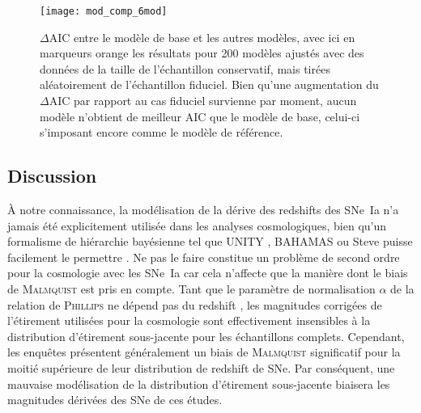 \documentclass[../main/main.tex]{subfiles}
\begin{document}
\begin{SCfigure}[0.8][ht!]
    \texttt{[image: mod\_comp\_6mod]}
    \caption[$\Delta$AIC pour des échantillons de taille conservative tirés
    aléatoirement de l'échantillon fiduciel]{$\Delta$AIC entre le modèle de
        base et les autres modèles, avec ici en marqueurs orange les
        résultats pour 200 modèles ajustés avec des données de la taille de
        l'échantillon conservatif, mais tirées aléatoirement de l'échantillon
        fiduciel. Bien qu'une augmentation du $\Delta$AIC par rapport au cas
        fiduciel survienne par moment, aucun modèle n'obtient de meilleur AIC
        que le modèle de base, celui-ci s'imposant encore comme le modèle de
    référence.}
    \label{fig:mod_comp_cal}
\end{SCfigure}

\subsection{Discussion}\label{ssec:disc}

À notre connaissance, la modélisation de la dérive des redshifts des SNe~Ia n'a
jamais été explicitement utilisée dans les analyses cosmologiques, bien qu'un
formalisme de hiérarchie bayésienne tel que UNITY \citep{rubin2015}, BAHAMAS
\citep{shariff2016} ou Steve \citep{hinton2019} puisse facilement le permettre
\citep[voir, par exemple, les sections 1.3 et 2.5 de][]{rubin2015}. Ne pas le
faire constitue un problème de second ordre pour la cosmologie avec les SNe~Ia
car cela n'affecte que la manière dont le biais de \textsc{Malmquist} est pris
en compte. Tant que le paramètre de normalisation $\alpha$ de la relation de
\textsc{Phillips} \citep{phillips1993} ne dépend pas du redshift \citep[une
étude qui dépasse le cadre de cette thèse, mais voir, par
exemple][]{scolnic2018}, les magnitudes corrigées de l'étirement utilisées pour
la cosmologie sont effectivement insensibles à la distribution d'étirement
sous-jacente pour les échantillons complets. Cependant, les enquêtes présentent
généralement un biais de \textsc{Malmquist} significatif pour la moitié
supérieure de leur distribution de redshift de SNe. Par conséquent, une mauvaise
modélisation de la distribution d'étirement sous-jacente biaisera les magnitudes
dérivées des SNe de ces études.
\end{document}
